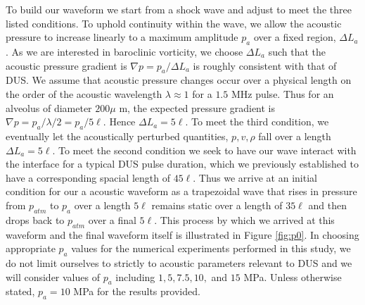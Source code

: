 To build our waveform we start from a shock wave and adjust to meet
the three listed conditions. To uphold continuity within the wave, we
allow the acoustic pressure to increase linearly to a maximum
amplitude $p_a$ over a fixed region, $\Delta L_a$. As we are
interested in baroclinic vorticity, we choose $\Delta L_a$ such that
the acoustic pressure gradient is $\nabla p=p_a/\Delta L_a$ is roughly
consistent with that of \ac{DUS}. We assume that acoustic pressure
changes occur over a physical length on the order of the acoustic
wavelength $\lambda\approx 1$ for a $1.5$ MHz pulse. Thus for an
alveolus of diameter $200 \mu$ m, the expected pressure gradient is
$\nabla p=p_a/\lambda/2=p_a/5\ell$. Hence $\Delta L_a=5\ell$. To meet
the third condition, we eventually let the acoustically perturbed
quantities, $p, v, \rho$ fall over a length $\Delta L_a=5\ell$. To
meet the second condition we seek to have our wave interact with the
interface for a typical \ac{DUS} pulse duration, which we previously
established to have a corresponding spacial length of $45\ell$. Thus
we arrive at an initial condition for our a acoustic waveform as a
trapezoidal wave that rises in pressure from $p_{atm}$ to $p_a$ over a
length $5\ell$ remains static over a length of $35\ell$ and then drops
back to $p_{atm}$ over a final $5\ell$. This process by which we
arrived at this waveform and the final waveform itself is illustrated
in Figure \ref{fig:p0}. In choosing appropriate $p_a$ values for the
numerical experiments performed in this study, we do not limit
ourselves to strictly to acoustic parameters relevant to \ac{DUS} and
we will consider values of $p_a$ including $1, 5, 7.5, 10,$ and $15$
MPa. Unless otherwise stated, $p_a=10$ MPa for the results provided.
